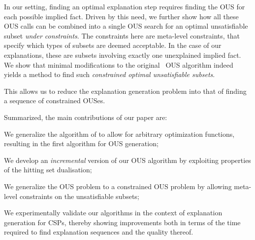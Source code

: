 In our setting, finding an optimal explanation step requires finding the OUS for each possible implied fact. Driven by this need, we further show how all these OUS calls can be combined into a single OUS search for an optimal unsatisfiable subset \emph{under constraints}. The constraints here are meta-level constraints, that specify which types of subsets are deemed acceptable. In the case of our explanations, these are subsets involving exactly one unexplained implied fact.
We show that minimal modifications to the original \hitsetbased~OUS algorithm indeed yields a method to find such \emph{constrained optimal unsatisfiable subsets}.

This allows us to reduce the explanation generation problem into that of finding a sequence of constrained OUSes.




Summarized, the main contributions of our paper are:
\begin{compactitem}
  \item We generalize the algorithm of \citet{ignatiev2015smallest} to allow for arbitrary  optimization functions, resulting in the first algorithm for OUS generation;
  \item We develop an \emph{incremental} version of our OUS algorithm by exploiting properties of the hitting set dualisation;
  \item We generalize the OUS problem to a constrained OUS problem by allowing meta-level constraints on the unsatisfiable subsets; %
  \item We experimentally validate our algorithms in the context of explanation generation for CSPs, thereby showing improvements both in terms of the time required to find explanation sequences and the quality thereof. %
\end{compactitem}



